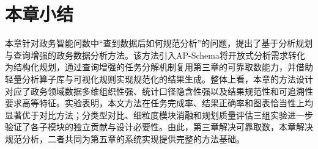 

\section{本章小结}

本章针对政务智能问数中“查到数据后如何规范分析”的问题，提出了基于分析规划与查询增强的政务数据分析方法。该方法引入AP-Schema将开放式分析需求转化为结构化规划，通过查询增强的任务分解机制复用第三章的可靠取数能力，并借助轻量分析算子库与可视化规则实现规范化的结果生成。整体上看，本章的方法设计对应了政务领域数据多维组织性强、统计口径隐含性强以及结果规范性和可追溯性要求高等特征。实验表明，本文方法在任务完成率、结果正确率和图表恰当性上均显著优于对比方法；分类型对比、细粒度模块消融和规划质量评估三组实验进一步验证了各子模块的独立贡献与设计必要性。由此，第三章解决可靠取数，本章解决规范分析，二者共同为第五章的系统实现提供完整的方法基础。
